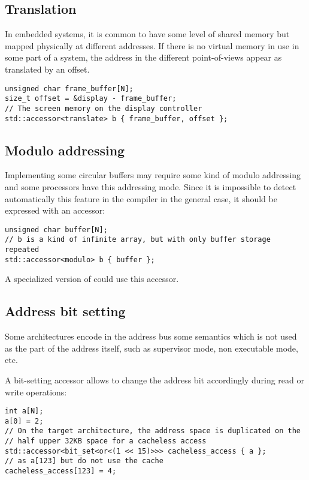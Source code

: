 \documentclass[a4paper]{article}
\begin{document}
\subsection{Translation}
\label{sec:translation}

In embedded systems, it is common to have some level of shared memory
but mapped physically at different addresses. If there is no virtual
memory in use in some part of a system, the address in the different
point-of-views appear as translated by an offset.
\begin{lstlisting}
unsigned char frame_buffer[N];
size_t offset = &display - frame_buffer;
// The screen memory on the display controller
std::accessor<translate> b { frame_buffer, offset };
\end{lstlisting}


\subsection{Modulo addressing}
\label{sec:modulo-addressing}

Implementing some circular buffers may require some kind of modulo
addressing and some processors have this addressing mode. Since it is
impossible to detect automatically this feature in the compiler in the
general case, it should be expressed with an accessor:
\begin{lstlisting}
unsigned char buffer[N];
// b is a kind of infinite array, but with only buffer storage repeated
std::accessor<modulo> b { buffer };
\end{lstlisting}
A specialized version of \cite{C++:P0059R1:ring} could use this
accessor.


\subsection{Address bit setting}
\label{sec:address-bit-setting}

Some architectures encode in the address bus some semantics which is
not used as the part of the address itself, such as supervisor mode,
non executable mode, etc.

A bit-setting accessor allows to change the address bit accordingly
during read or write operations:
\begin{lstlisting}
int a[N];
a[0] = 2;
// On the target architecture, the address space is duplicated on the
// half upper 32KB space for a cacheless access
std::accessor<bit_set<or<(1 << 15)>>> cacheless_access { a };
// as a[123] but do not use the cache
cacheless_access[123] = 4;
\end{lstlisting}
\end{document}
